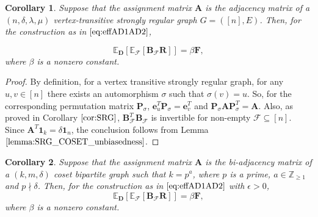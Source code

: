 \documentclass[journal,draftcls,onecolumn]{IEEEtran}
\theoremstyle{mystyle}
\newtheorem{cor}{Corollary}
\newcommand{\bfA}{\mathbf{A}}
\newcommand{\bfB}{\mathbf{B}}
\newcommand{\bfP}{\mathbf{P}}
\newcommand{\cF}{\mathcal{F}}
\begin{document}
\begin{cor}
\label{cor:SRG_unbiased}
 Suppose that the assignment matrix $\mathbf{A}$ is the adjacency matrix of a $(n, \delta, \lambda, \mu)$ vertex-transitive strongly regular graph $G = ([n], E)$. 
Then, for the construction as in $\eqref{eq:effAD1AD2}$,

 \[ \mathbb{E}_{\mathbf{D}}[\mathbb{E}_{\mathcal{F}}[\mathbf{B}_{\cF} \mathbf{R}]]= \beta\mathbf{F},\]
where $\beta$ is a nonzero constant.

\end{cor}

\begin{proof}
By definition, for a vertex transitive strongly regular graph, for any $u, v \in [n]$ there exists an automorphism $\sigma$ such that $\sigma(v) = u$. So, for                    the corresponding permutation matrix $\bfP_{\sigma}$, $\mathbf{e}_{u}^T\bfP_{\sigma} = \mathbf{e}_{v}^T$ and $\bfP_{\sigma}\bfA \bfP_{\sigma}^T = \bfA$. Also, as proved in Corollary $\ref{cor:SRG}$, $\bfB_{\cF}^T \bfB_{\cF}$ is invertible for non-empty $\cF \subseteq [n]$. Since $\bfA^T \mathbf{1}_k = \delta \mathbf{1}_n$, the conclusion follows from Lemma $\ref{lemma:SRG_COSET_unbiasedness}$.
\end{proof}


\begin{cor}
\label{cor:COSET_unbiased}
Suppose that the assignment matrix $\mathbf{A}$ is the bi-adjacency matrix of a $(k,m,\delta)$ coset bipartite graph such that $k = p^a$, where $p$ is a prime, $a \in \mathbb{Z}_{\ge 1}$ and $p \nmid \delta$. Then, for the construction as in $\eqref{eq:effAD1AD2}$ with $\epsilon > 0$,
\[ \mathbb{E}_{\mathbf{D}}[\mathbb{E}_{\mathcal{F}}[\mathbf{B}_{\cF} \mathbf{R}]]= \beta\mathbf{F},\]
where $\beta$ is a nonzero constant.
\end{cor}
\end{document}
